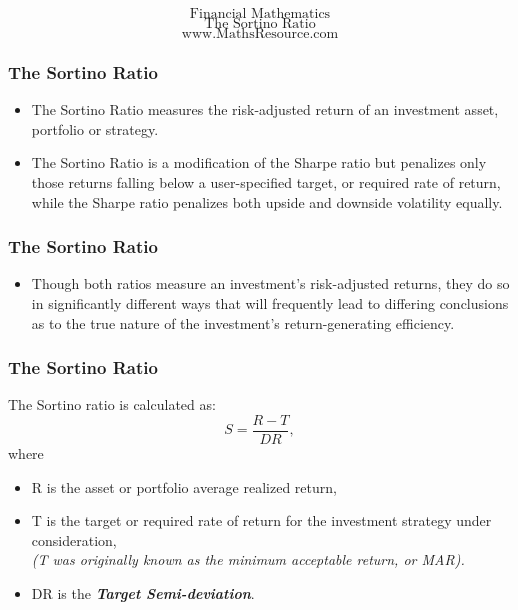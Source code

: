 \documentclass{beamer}
\begin{document}
\begin{frame}
	
	{
		\huge
		\[ \mbox{Financial Mathematics} \]
		\[ \mbox{The Sortino Ratio} \]
	}
	{
		\Large
		\[ \mbox{www.MathsResource.com} \]
	}
	
\end{frame}

\begin{frame}

\frametitle{The Sortino Ratio}
\Large
\begin{itemize}
\item The Sortino Ratio measures the risk-adjusted return of an investment asset, 
portfolio or strategy. 
\item The Sortino Ratio is a modification of the Sharpe ratio but penalizes only those returns falling below a user-specified target, or required rate of return, while the Sharpe ratio penalizes both upside and downside volatility equally. 
\end{itemize}
\end{frame}
\begin{frame}
\frametitle{The Sortino Ratio}
\Large
\begin{itemize}
\item Though both ratios measure an investment's risk-adjusted returns, they do so in significantly different ways that will frequently lead to differing conclusions as to the true nature of the investment's return-generating efficiency. 
\end{itemize}
\end{frame}
\begin{frame}
	\frametitle{The Sortino Ratio}
	\Large

The Sortino ratio is calculated as:
\[S = \frac{R-T}{DR},\]
where 
\begin{itemize}
\item R is the asset or portfolio average realized return, 
\item T is the target or required rate of return for the investment strategy 
under consideration, \\ \textit{(T was originally known as the minimum acceptable return, or MAR).} 
\item DR is the \textbf{\textit{Target Semi-deviation}}.
\end{itemize}
\end{frame}
\end{document}
